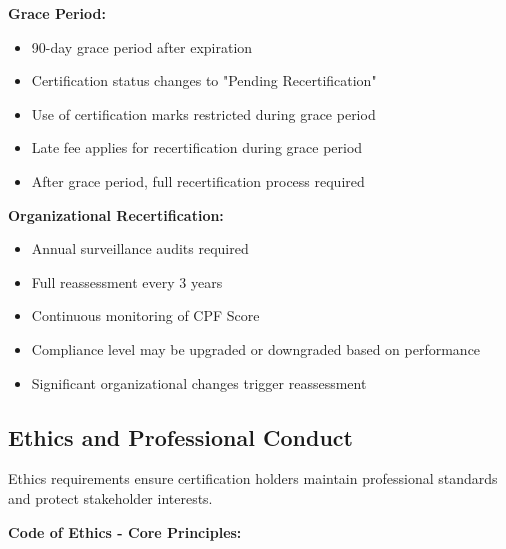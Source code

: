 \documentclass[11pt,a4paper]{article}
\begin{document}
\textbf{Grace Period:}
\begin{itemize}
\item 90-day grace period after expiration
\item Certification status changes to "Pending Recertification"
\item Use of certification marks restricted during grace period
\item Late fee applies for recertification during grace period
\item After grace period, full recertification process required
\end{itemize}

\textbf{Organizational Recertification:}
\begin{itemize}
\item Annual surveillance audits required
\item Full reassessment every 3 years
\item Continuous monitoring of CPF Score
\item Compliance level may be upgraded or downgraded based on performance
\item Significant organizational changes trigger reassessment
\end{itemize}

\subsection{Ethics and Professional Conduct}

Ethics requirements ensure certification holders maintain professional standards and protect stakeholder interests.

\textbf{Code of Ethics - Core Principles:}
\end{document}

